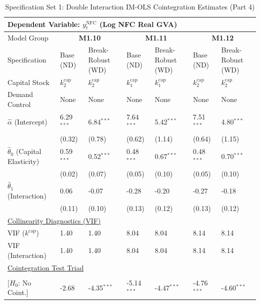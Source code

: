 \begin{table}[H]
\centering
\caption{Specification Set 1: Double Interaction IM-OLS Cointegration Estimates (Part 4)}
\label{tab:spec_set_1_p4}
\scriptsize
\begin{tabular}{p{3.8cm}p{2.1cm}p{2.1cm}p{2.1cm}p{2.1cm}p{2.1cm}p{2.1cm}}
\toprule
\multicolumn{7}{l}{\textbf{Dependent Variable: $y_t^{\text{NFC}}$ (Log NFC Real GVA)}} \\
\midrule
Model Group & \multicolumn{2}{c}{\textbf{M1.10}} & \multicolumn{2}{c}{\textbf{M1.11}} & \multicolumn{2}{c}{\textbf{M1.12}}  \\
Specification & Base (ND) & Break-Robust (WD) & Base (ND) & Break-Robust (WD) & Base (ND) & Break-Robust (WD)  \\
Capital Stock & $k^{\text{cap}}_2$ & $k^{\text{cap}}_2$ & $k^{\text{cap}}_1$ & $k^{\text{cap}}_1$ & $k^{\text{cap}}_2$ & $k^{\text{cap}}_2$  \\
Demand Control & None & None & None & None & None & None  \\
\midrule
$\hat{\alpha}$ (Intercept)  & 6.29$^{***}$ & 6.84$^{***}$ & 7.64$^{***}$ & 5.42$^{***}$ & 7.51$^{***}$ & 4.80$^{***}$  \\
 & {\scriptsize (0.32)} & {\scriptsize (0.78)} & {\scriptsize (0.62)} & {\scriptsize (1.14)} & {\scriptsize (0.64)} & {\scriptsize (1.15)}  \\
[1ex]
$\hat{\theta}_0$ (Capital Elasticity)  & 0.59$^{***}$ & 0.52$^{***}$ & 0.48$^{***}$ & 0.67$^{***}$ & 0.48$^{***}$ & 0.70$^{***}$  \\
 & {\scriptsize (0.02)} & {\scriptsize (0.07)} & {\scriptsize (0.05)} & {\scriptsize (0.10)} & {\scriptsize (0.05)} & {\scriptsize (0.10)}  \\
$\hat{\theta}_1$ (Interaction)  & 0.06 & -0.07 & -0.28 & -0.20 & -0.27 & -0.18  \\
 & {\scriptsize (0.11)} & {\scriptsize (0.10)} & {\scriptsize (0.13)} & {\scriptsize (0.12)} & {\scriptsize (0.13)} & {\scriptsize (0.12)}  \\
\midrule
\multicolumn{7}{l}{\underline{Collinearity Diagnostics (VIF)}} \\
VIF ($k^{\text{cap}}$) & 1.40 & 1.40 & 8.04 & 8.04 & 8.14 & 8.14  \\
VIF (Interaction) & 1.40 & 1.40 & 8.04 & 8.04 & 8.14 & 8.14  \\
\midrule
\multicolumn{7}{l}{\underline{Cointegration Test Triad}} \\
\makecell[l]{Resid. ADF ($t_{\text{ADF}}$) \\ {\scriptsize [$H_0$: No Coint.]}} & -2.68 & -4.35$^{***}$ & -5.14$^{***}$ & -4.47$^{***}$ & -4.76$^{***}$ & -4.60$^{***}$  \\

\end{tabular}
\end{table}
